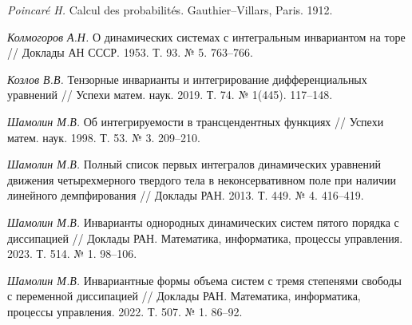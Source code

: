 \begin{thebibliography}{9} %
\textit{Poincar\'{e} H.}
Calcul des probabilit\'{e}s. Gauthier--Villars, Paris. 1912. %

\textit{Колмогоров А.Н.}
О динамических системах с интегральным инвариантом на торе 
// Доклады АН СССР. 1953. Т. 93. № 5. 763--766.

\textit{Козлов В.В.}
Тензорные инварианты и интегрирование дифференциальных
уравнений // Успехи матем. наук. 2019. Т. 74. № 1(445). 117--148.

\textit{Шамолин М.В.}
Об интегрируемости в трансцендентных функциях // Успехи матем. наук. 1998. Т. 53. № 3. 209--210.

\textit{Шамолин М.В.}
Полный список первых интегралов динамических уравнений движения четырехмерного твердого тела в неконсервативном поле при наличии линейного демпфирования
// Доклады РАН. 2013. Т. 449. № 4. 416--419.

\textit{Шамолин М.В.}
Инварианты однородных динамических систем пятого порядка с диссипацией
// Доклады РАН. Математика, информатика, процессы управления. 2023. Т. 514. № 1. 98--106.

\textit{Шамолин М.В.}
Инвариантные формы объема систем с тремя степенями свободы с переменной диссипацией
// Доклады РАН. Математика, информатика, процессы управления. 2022. Т. 507. № 1. 86--92.







\end{thebibliography}





%